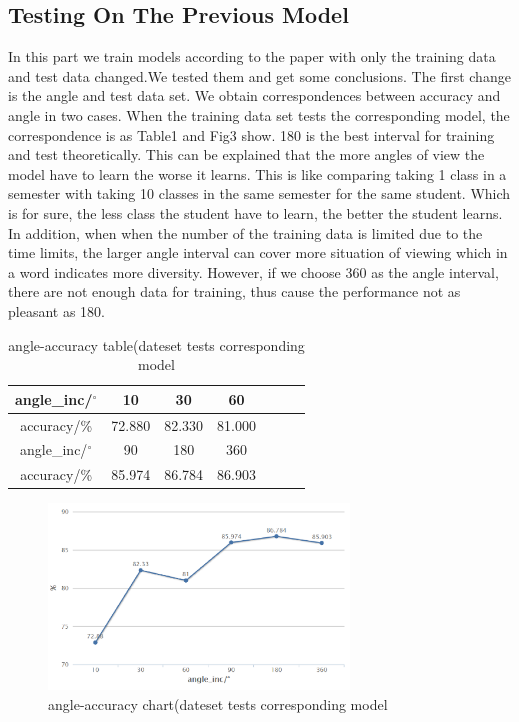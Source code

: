 \documentclass[11pt,journal,compsoc]{IEEEtran}
\begin{document}
  \subsection{Testing On The Previous Model}
  In this part we train models according to the paper with only the training data and test data changed.We tested them and get some conclusions. The first change is the angle and test data set. We obtain correspondences between accuracy and angle in two cases. 
  When the training data set tests the corresponding model, the correspondence is as Table1 and Fig3 show. 180 is the best interval for training and test theoretically. This can be explained that the more angles of view the model have to learn the worse it learns. This is like  comparing taking 1 class in a semester with taking 10 classes in the same semester for the same student. Which is for sure, the less class the student have to learn, the better the student learns. In addition, when when the number of the training data is limited due to the time limits, the larger angle interval can cover more situation of viewing which in a word indicates more diversity. However, if we choose 360 as the angle interval, there are not enough data for training, thus cause the performance not as pleasant as 180.

  \begin{table}[ht]
  \caption{angle-accuracy table(dateset tests corresponding model} %
  \centering %
    \begin{tabular}{|c|c|c|c|c|c|c|}
    \hline 
    angle\_inc/$^{\circ}$&10&30&60\\
    \hline  
    accuracy/\%&72.880&82.330&81.000\\
    \hline 
    angle\_inc/$^{\circ}$&90&180&360\\
    \hline  
    accuracy/\%&85.974&86.784&86.903\\
    \hline 
    \end{tabular}
  \end{table}
  
  \begin{figure}[ht]
    \centering
    \includegraphics[width=8cm]{pic/result1.png}
    \caption{angle-accuracy chart(dateset tests corresponding model}
    \label{figure:label}
  \end{figure}
\end{document}
